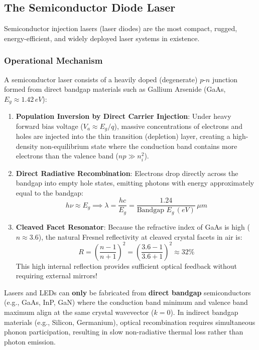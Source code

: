 \subsection{The Semiconductor Diode Laser}
Semiconductor injection lasers (laser diodes) are the most compact, rugged, energy-efficient, and widely deployed laser systems in existence.

\subsubsection{Operational Mechanism}
A semiconductor laser consists of a heavily doped (degenerate) $p$-$n$ junction formed from direct bandgap materials such as Gallium Arsenide (GaAs, $E_g \approx 1.42\,\si{eV}$):
\begin{enumerate}
    \item \textbf{Population Inversion by Direct Carrier Injection}:
    Under heavy forward bias voltage ($V_a \approx E_g/q$), massive concentrations of electrons and holes are injected into the thin transition (depletion) layer, creating a high-density non-equilibrium state where the conduction band contains more electrons than the valence band ($n p \gg n_i^2$).
    \item \textbf{Direct Radiative Recombination}:
    Electrons drop directly across the bandgap into empty hole states, emitting photons with energy approximately equal to the bandgap:
    \begin{equation}
        h\nu \approx E_g \implies \lambda = \frac{hc}{E_g} = \frac{1.24}{\text{Bandgap } E_g\,(\si{eV})}\,\si{\mu m}
    \end{equation}
    \item \textbf{Cleaved Facet Resonator}:
    Because the refractive index of GaAs is high ($n \approx 3.6$), the natural Fresnel reflectivity at cleaved crystal facets in air is:
    \begin{equation}
        R = \left( \frac{n - 1}{n + 1} \right)^2 = \left( \frac{3.6 - 1}{3.6 + 1} \right)^2 \approx 32\%
    \end{equation}
    This high internal reflection provides sufficient optical feedback without requiring external mirrors!
\end{enumerate}

\begin{examtip}
Lasers and LEDs can \textbf{only} be fabricated from \textbf{direct bandgap} semiconductors (e.g., GaAs, InP, GaN) where the conduction band minimum and valence band maximum align at the same crystal wavevector ($k=0$). In indirect bandgap materials (e.g., Silicon, Germanium), optical recombination requires simultaneous phonon participation, resulting in slow non-radiative thermal loss rather than photon emission.
\end{examtip}

